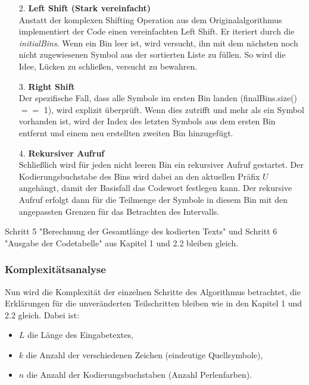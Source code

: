 \documentclass[a4paper,10pt,ngerman]{scrartcl}
\begin{document}
\begin{enumerate}
\begin{enumerate}
    \item [2.] \textbf{Left Shift (Stark vereinfacht)}\\
    Anstatt der komplexen Shifting Operation aus dem Originalalgorithmus implementiert der Code einen vereinfachten Left Shift. Er iteriert durch die \textit{initialBins}. Wenn ein Bin leer ist, wird versucht, ihn mit dem nächsten noch nicht zugewiesenen Symbol aus der sortierten Liste zu füllen. So wird die Idee, Lücken zu schließen, versucht zu bewahren. 
    \item [3.] \textbf{Right Shift}\\
    Der spezifische Fall, dass alle Symbole im ersten Bin landen (finalBins.size() $==$ 1), wird explizit überprüft. Wenn dies zutrifft und mehr als ein Symbol vorhanden ist, wird der Index des letzten Symbols aus dem ersten Bin entfernt und einem neu erstellten zweiten Bin hinzugefügt. 
    \item [4.] \textbf{Rekursiver Aufruf}\\
    Schließlich wird für jeden nicht leeren Bin ein rekursiver Aufruf gestartet. Der Kodierungsbuchstabe des Bins wird dabei an den aktuellen Präfix $U$ angehängt, damit der Basisfall das Codewort festlegen kann. Der rekursive Aufruf erfolgt dann für die Teilmenge der Symbole in diesem Bin mit den angepassten Grenzen für das Betrachten des Intervalls. 
  \end{enumerate}
\end{enumerate}

Schritt 5 "Berechnung der Gesamtlänge des kodierten Texts" und Schritt 6 "Ausgabe der Codetabelle" aus Kapitel 1 und 2.2 bleiben gleich. 

\subsubsection{Komplexitätsanalyse}
Nun wird die Komplexität der einzelnen Schritte des Algorithmus betrachtet, die Erklärungen für die unveränderten Teilschritten bleiben wie in den Kapitel 1 und 2.2 gleich. Dabei ist:
\begin{itemize}
  \item $L$ die Länge des Eingabetextes,
  \item $k$ die Anzahl der verschiedenen Zeichen (eindeutige Quellsymbole),
  \item $n$ die Anzahl der Kodierungsbuchstaben (Anzahl Perlenfarben).
\end{itemize}
\vspace{0.2cm}
\end{document}
